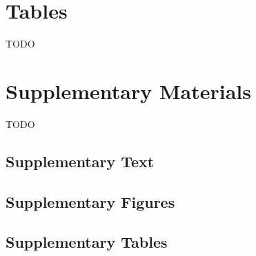 \documentclass[smallextended]{svjour3}
\newcommand{\beginsupplement}{%
        \setcounter{table}{0}
        \renewcommand{\thetable}{S\arabic{table}}
        \setcounter{figure}{0}
        \renewcommand{\thefigure}{S\arabic{figure}}
        \renewcommand{\thesection}{S\arabic{section}}
        \renewcommand{\thesubsection}{S\arabic{subsection}}
     }
\begin{document}
\clearpage

\section*{Tables}
TODO


\clearpage


\beginsupplement%

\section*{Supplementary Materials}
TODO

\subsection*{Supplementary Text}\label{ss:supp}




\subsection*{Supplementary Figures}\label{ss:sfig}

\subsection*{Supplementary Tables}\label{ss:stab}
\end{document}
